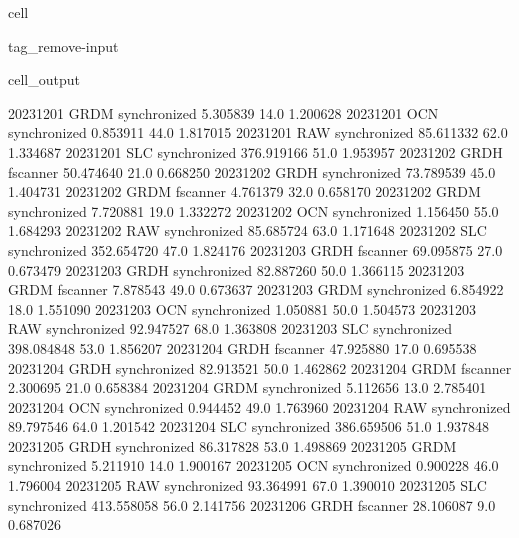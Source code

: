 \documentclass[letterpaper,10pt,english]{jupyterBook}
\begin{document}
\begin{sphinxuseclass}{cell}
\begin{sphinxuseclass}{tag_remove-input}
\begin{sphinxVerbatimOutput}
\begin{sphinxuseclass}{cell_output}
\begin{sphinxVerbatim}[commandchars=\\\{\}]
2023\PYGZhy{}12\PYGZhy{}01         GRDM  synchronized    5.305839    14.0    1.200628
2023\PYGZhy{}12\PYGZhy{}01          OCN  synchronized    0.853911    44.0    1.817015
2023\PYGZhy{}12\PYGZhy{}01          RAW  synchronized   85.611332    62.0    1.334687
2023\PYGZhy{}12\PYGZhy{}01          SLC  synchronized  376.919166    51.0    1.953957
2023\PYGZhy{}12\PYGZhy{}02         GRDH      fscanner   50.474640    21.0    0.668250
2023\PYGZhy{}12\PYGZhy{}02         GRDH  synchronized   73.789539    45.0    1.404731
2023\PYGZhy{}12\PYGZhy{}02         GRDM      fscanner    4.761379    32.0    0.658170
2023\PYGZhy{}12\PYGZhy{}02         GRDM  synchronized    7.720881    19.0    1.332272
2023\PYGZhy{}12\PYGZhy{}02          OCN  synchronized    1.156450    55.0    1.684293
2023\PYGZhy{}12\PYGZhy{}02          RAW  synchronized   85.685724    63.0    1.171648
2023\PYGZhy{}12\PYGZhy{}02          SLC  synchronized  352.654720    47.0    1.824176
2023\PYGZhy{}12\PYGZhy{}03         GRDH      fscanner   69.095875    27.0    0.673479
2023\PYGZhy{}12\PYGZhy{}03         GRDH  synchronized   82.887260    50.0    1.366115
2023\PYGZhy{}12\PYGZhy{}03         GRDM      fscanner    7.878543    49.0    0.673637
2023\PYGZhy{}12\PYGZhy{}03         GRDM  synchronized    6.854922    18.0    1.551090
2023\PYGZhy{}12\PYGZhy{}03          OCN  synchronized    1.050881    50.0    1.504573
2023\PYGZhy{}12\PYGZhy{}03          RAW  synchronized   92.947527    68.0    1.363808
2023\PYGZhy{}12\PYGZhy{}03          SLC  synchronized  398.084848    53.0    1.856207
2023\PYGZhy{}12\PYGZhy{}04         GRDH      fscanner   47.925880    17.0    0.695538
2023\PYGZhy{}12\PYGZhy{}04         GRDH  synchronized   82.913521    50.0    1.462862
2023\PYGZhy{}12\PYGZhy{}04         GRDM      fscanner    2.300695    21.0    0.658384
2023\PYGZhy{}12\PYGZhy{}04         GRDM  synchronized    5.112656    13.0    2.785401
2023\PYGZhy{}12\PYGZhy{}04          OCN  synchronized    0.944452    49.0    1.763960
2023\PYGZhy{}12\PYGZhy{}04          RAW  synchronized   89.797546    64.0    1.201542
2023\PYGZhy{}12\PYGZhy{}04          SLC  synchronized  386.659506    51.0    1.937848
2023\PYGZhy{}12\PYGZhy{}05         GRDH  synchronized   86.317828    53.0    1.498869
2023\PYGZhy{}12\PYGZhy{}05         GRDM  synchronized    5.211910    14.0    1.900167
2023\PYGZhy{}12\PYGZhy{}05          OCN  synchronized    0.900228    46.0    1.796004
2023\PYGZhy{}12\PYGZhy{}05          RAW  synchronized   93.364991    67.0    1.390010
2023\PYGZhy{}12\PYGZhy{}05          SLC  synchronized  413.558058    56.0    2.141756
2023\PYGZhy{}12\PYGZhy{}06         GRDH      fscanner   28.106087     9.0    0.687026

\end{sphinxVerbatim}
\end{sphinxuseclass}
\end{sphinxVerbatimOutput}
\end{sphinxuseclass}
\end{sphinxuseclass}
\end{document}
